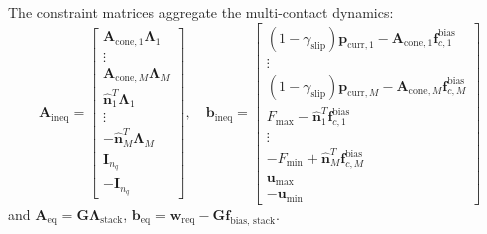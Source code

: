 The constraint matrices aggregate the multi-contact dynamics:
\begin{equation}
    \mathbf{A}_{\text{ineq}} = \begin{bmatrix}
        \mathbf{A}_{\text{cone}, 1} \mathbf{\Lambda}_1 \\
        \vdots \\
        \mathbf{A}_{\text{cone}, M} \mathbf{\Lambda}_M \\
        \hat{\mathbf{n}}_1^T \mathbf{\Lambda}_1 \\
        \vdots \\
        -\hat{\mathbf{n}}_M^T \mathbf{\Lambda}_M \\
        \mathbf{I}_{n_q} \\
        -\mathbf{I}_{n_q}
    \end{bmatrix}, \quad
    \mathbf{b}_{\text{ineq}} = \begin{bmatrix}
        (1 - \gamma_{\text{slip}}) \mathbf{p}_{\text{curr}, 1} - \mathbf{A}_{\text{cone}, 1} \mathbf{f}_{c, 1}^{\text{bias}} \\
        \vdots \\
        (1 - \gamma_{\text{slip}}) \mathbf{p}_{\text{curr}, M} - \mathbf{A}_{\text{cone}, M} \mathbf{f}_{c, M}^{\text{bias}} \\
        F_{\max} - \hat{\mathbf{n}}_1^T \mathbf{f}_{c, 1}^{\text{bias}} \\
        \vdots \\
        -F_{\min} + \hat{\mathbf{n}}_M^T \mathbf{f}_{c, M}^{\text{bias}} \\
        \mathbf{u}_{\max} \\
        -\mathbf{u}_{\min}
    \end{bmatrix}
\end{equation}
and $\mathbf{A}_{\text{eq}} = \mathbf{G} \mathbf{\Lambda}_{\text{stack}}$, $\mathbf{b}_{\text{eq}} = \mathbf{w}_{\text{req}} - \mathbf{G} \mathbf{f}_{\text{bias, stack}}$.

